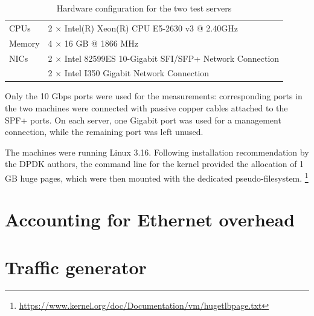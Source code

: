 \documentclass[12pt,a4paper,twoside]{book}
\begin{document}
\begin{table}[tb]
  \begin{center}
    \begin{tabular}{ll}
      \toprule
      CPUs   & 2 $\times$ Intel(R) Xeon(R) CPU E5-2630 v3 @ 2.40GHz \\
      Memory & 4 $\times$ 16 GB @ 1866 MHz\\
      NICs   & 2 $\times$ Intel 82599ES 10-Gigabit SFI/SFP+ Network Connection \\
             & 2 $\times$ Intel I350 Gigabit Network Connection \\
      \bottomrule
    \end{tabular}
  \end{center}
  \caption{Hardware configuration for the two test servers}
  \label{tab:test.hw}
\end{table}

Only the 10 Gbps ports were used for the measurements: corresponding ports in the two machines were connected with passive copper cables attached to the SPF+ ports. On each server, one Gigabit port was used for a management connection, while the remaining port was left unused.

The machines were running Linux 3.16. Following installation recommendation by the DPDK authors, the command line for the kernel provided the allocation of 1 GB huge pages, which were then mounted with the dedicated pseudo-filesystem.%
\footnote{\url{https://www.kernel.org/doc/Documentation/vm/hugetlbpage.txt}}



\section{Accounting for Ethernet overhead}\label{sec:test.overhead}

\section{Traffic generator}\label{sec:test.traffgen}
\end{document}
